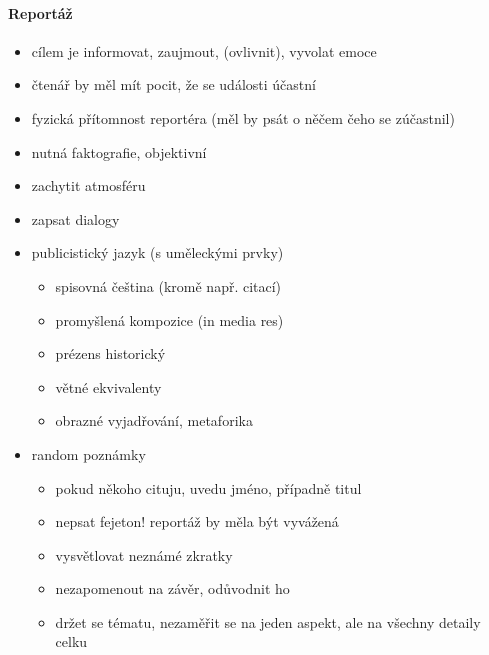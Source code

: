\paragraph{Reportáž}
\begin{itemize}
\item cílem je informovat, zaujmout, (ovlivnit), vyvolat emoce
\item čtenář by měl mít pocit, že se události účastní
\item fyzická přítomnost reportéra (měl by psát o něčem čeho se zúčastnil)
\item nutná faktografie, objektivní
\item zachytit atmosféru
\item zapsat dialogy
\item publicistický jazyk (s uměleckými prvky)
	\begin{itemize}
	\item spisovná čeština (kromě např. citací)
	\item promyšlená kompozice (in media res)
	\item prézens historický
	\item větné ekvivalenty
	\item obrazné vyjadřování, metaforika
	\end{itemize}
\item random poznámky
	\begin{itemize}
	\item pokud někoho cituju, uvedu jméno, případně titul
	\item nepsat fejeton! reportáž by měla být vyvážená
	\item vysvětlovat neznámé zkratky
	\item nezapomenout na závěr, odůvodnit ho
	\item držet se tématu, nezaměřit se na jeden aspekt, ale na všechny detaily celku
	\end{itemize}
\end{itemize}




